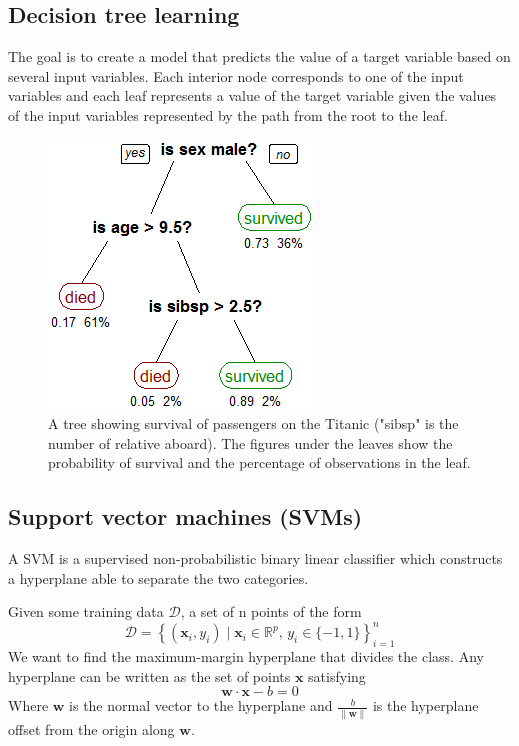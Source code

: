 \documentclass[twocolumn]{article}
\numberwithin{equation}{section}
\begin{document}
	\subsection{Decision tree learning}
The goal is to create a model that predicts the value of a target variable based on several input variables. Each interior node corresponds to one of the input variables and each leaf represents a value of the target variable given the values of the input variables represented by the path from the root to the leaf.
\begin{figure}[H]
	\centering
    \includegraphics[width=.3\textwidth]{CART_tree_titanic_survivors.png}
    \caption{A tree showing survival of passengers on the Titanic ("sibsp" is the number of relative aboard). The figures under the leaves show the probability of survival and the percentage of observations in the leaf.}
\end{figure}



	\subsection{Support vector machines (SVMs)}
A SVM is a supervised non-probabilistic binary linear classifier which constructs a hyperplane able to separate the two categories.

Given some training data $\mathcal{D}$, a set of n points of the form
$$\mathcal{D} = \left\{ (\mathbf{x}_i, y_i)\mid\mathbf{x}_i \in \mathbb{R}^p,\, y_i \in \{-1,1\}\right\}_{i=1}^n$$
We want to find the maximum-margin hyperplane that divides the class. Any hyperplane can be written as the set of points $\mathbf{x}$ satisfying 
$$\mathbf{w}\cdot\mathbf{x} - b=0$$
Where $\mathbf{w}$ is the normal vector to the hyperplane and $\tfrac{b}{\|\mathbf{w}\|}$ is the hyperplane offset from the origin along $\mathbf{w}$.
\end{document}

